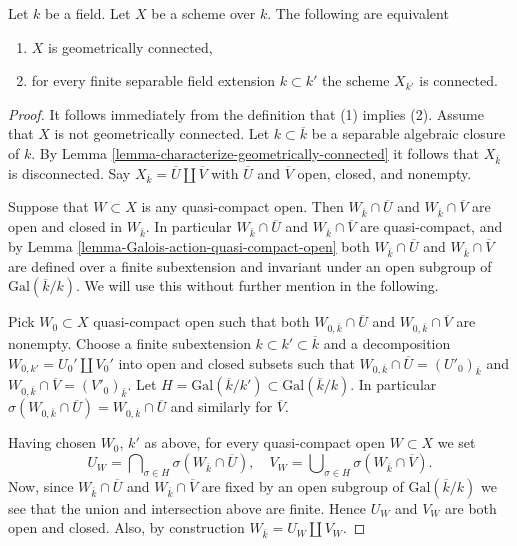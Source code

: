 \begin{lemma}
\label{lemma-characterize-geometrically-disconnected}
Let $k$ be a field.
Let $X$ be a scheme over $k$.
The following are equivalent
\begin{enumerate}
\item $X$ is geometrically connected,
\item for every finite separable field extension $k \subset k'$
the scheme $X_{k'}$ is connected.
\end{enumerate}
\end{lemma}

\begin{proof}
It follows immediately from the definition that (1) implies (2).
Assume that $X$ is not geometrically connected.
Let $k \subset \overline{k}$ be a separable algebraic
closure of $k$. By
Lemma \ref{lemma-characterize-geometrically-connected}
it follows that $X_{\overline{k}}$ is disconnected.
Say $X_{\overline{k}} = \overline{U} \amalg \overline{V}$
with $\overline{U}$ and $\overline{V}$ open, closed, and nonempty.

\medskip\noindent
Suppose that $W \subset X$ is any quasi-compact open.
Then $W_{\overline{k}} \cap \overline{U}$ and
$W_{\overline{k}} \cap \overline{V}$ are open and closed in
$W_{\overline{k}}$. In particular $W_{\overline{k}} \cap \overline{U}$ and
$W_{\overline{k}} \cap \overline{V}$ are quasi-compact, and by
Lemma \ref{lemma-Galois-action-quasi-compact-open}
both $W_{\overline{k}} \cap \overline{U}$ and
$W_{\overline{k}} \cap \overline{V}$
are defined over a finite subextension and invariant under an
open subgroup of $\text{Gal}(\overline{k}/k)$.
We will use this without further mention in the following.

\medskip\noindent
Pick $W_0 \subset X$ quasi-compact open such that both
$W_{0, \overline{k}} \cap \overline{U}$ and
$W_{0, \overline{k}} \cap \overline{V}$ are nonempty.
Choose a finite subextension $k \subset k' \subset \overline{k}$
and a decomposition $W_{0, k'} = U_0' \amalg V_0'$ into open and closed
subsets such that
$W_{0, \overline{k}} \cap \overline{U} = (U'_0)_{\overline{k}}$ and
$W_{0, \overline{k}} \cap \overline{V} = (V'_0)_{\overline{k}}$.
Let $H = \text{Gal}(\overline{k}/k') \subset \text{Gal}(\overline{k}/k)$.
In particular
$\sigma(W_{0, \overline{k}} \cap \overline{U}) =
W_{0, \overline{k}} \cap \overline{U}$ and similarly for
$\overline{V}$.

\medskip\noindent
Having chosen $W_0$, $k'$ as above, for every quasi-compact open
$W \subset X$ we set
$$
U_W =
\bigcap\nolimits_{\sigma \in H} \sigma(W_{\overline{k}} \cap \overline{U}),
\quad
V_W =
\bigcup\nolimits_{\sigma \in H} \sigma(W_{\overline{k}} \cap \overline{V}).
$$
Now, since $W_{\overline{k}} \cap \overline{U}$ and
$W_{\overline{k}} \cap \overline{V}$ are fixed by an open subgroup of
$\text{Gal}(\overline{k}/k)$ we see that the union and intersection
above are finite. Hence $U_W$ and $V_W$ are both open and closed.
Also, by construction $W_{\bar k} = U_W \amalg V_W$.


\end{proof}

